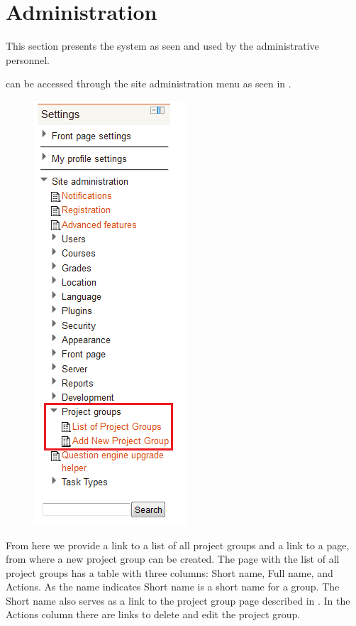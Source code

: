 


\section{Administration}
\label{sec:adminPrensentation}
This section presents the system as seen and used by the administrative personnel.

can be accessed through the site administration menu as seen in .

\begin{figure}[htb]
	\centering
		\includegraphics[scale=0.75]{images/admin-navigation.png}
	\label{fig:navigation}
\end{figure}

From here we provide a link to a list of all project groups and a link to a page, from where a new project group can be created.
The page with the list of all project groups has a table with three columns: Short name, Full name, and Actions.
As the name indicates Short name is a short name for a group. 
The Short name also serves as a link to the project group page described in .
In the Actions column there are links to delete and edit the project group.